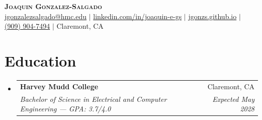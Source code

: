 \documentclass[letterpaper,11pt]{article}
\makeatletter
\newcommand{\resumeSubheading}[4]{
  \vspace{-2pt}\item
    \begin{tabular*}{0.97\textwidth}[t]{l@{\extracolsep{\fill}}r}
      \textbf{#1} & #2 \\
      \textit{\small#3} & \textit{\small #4} \\
    \end{tabular*}\vspace{-7pt}
}
\newcommand{\resumeSubHeadingListStart}{\begin{itemize}[leftmargin=0.15in, label={}]}
\newcommand{\resumeSubHeadingListEnd}{\end{itemize}}
\makeatother
\begin{document}
\begin{center}
    \textbf{\Huge \scshape Joaquin Gonzalez-Salgado} \\ \vspace{1pt}
    \small \href{mailto:jgonzalezsalgado@hmc.edu}{jgonzalezsalgado@hmc.edu} $|$
    \href{https://www.linkedin.com/in/joaquin-e-gs/}{linkedin.com/in/joaquin-e-gs} $|$
    \href{https://jgonzs.github.io}{jgonzs.github.io} $|$
    \href{tel:+19099047494}{(909) 904-7494} $|$
    Claremont, CA
\end{center}

\section{Education}
\resumeSubHeadingListStart
\resumeSubheading
{Harvey Mudd College}{Claremont, CA}
{Bachelor of Science in Electrical and Computer Engineering --- GPA: 3.7/4.0}{Expected May 2028}
\resumeSubHeadingListEnd
\end{document}

